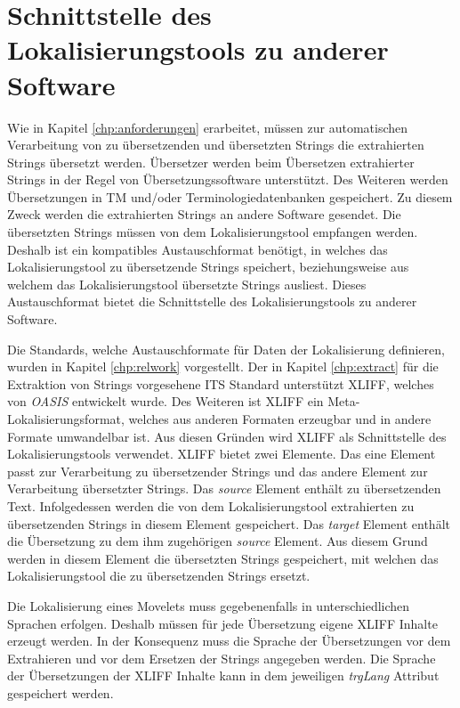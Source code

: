 \chapter{Schnittstelle des Lokalisierungstools zu anderer Software}
Wie in Kapitel \ref{chp:anforderungen} erarbeitet, müssen zur automatischen Verarbeitung von zu übersetzenden und übersetzten Strings die extrahierten Strings übersetzt werden. Übersetzer werden beim Übersetzen extrahierter Strings in der Regel von Übersetzungssoftware unterstützt. Des Weiteren werden Übersetzungen in \ac{TM} und/oder Terminologiedatenbanken gespeichert. 
\autocite[Vgl.][S. 187]{OBrien.2010}
Zu diesem Zweck werden die extrahierten Strings an andere Software gesendet. Die übersetzten Strings müssen von dem Lokalisierungstool empfangen werden. Deshalb ist ein kompatibles Austauschformat benötigt, in welches das Lokalisierungstool zu übersetzende Strings speichert, beziehungsweise aus welchem das Lokalisierungstool übersetzte Strings ausliest. Dieses Austauschformat bietet die Schnittstelle des Lokalisierungstools zu anderer Software.
\par
Die Standards, welche Austauschformate für Daten der Lokalisierung definieren, wurden in Kapitel \ref{chp:relwork} vorgestellt. Der in Kapitel \ref{chp:extract} für die Extraktion von Strings vorgesehene \ac{ITS} Standard unterstützt \ac{XLIFF}, welches von \textit{\ac{OASIS}} entwickelt wurde.
\autocite[Vgl.][]{Filip.2013}
Des Weiteren ist \ac{XLIFF} ein Meta-Lokalisierungsformat, welches aus anderen Formaten erzeugbar und in andere Formate umwandelbar ist.
\autocite[Vgl.][S. 162]{Reineke.2005}
Aus diesen Gründen wird \ac{XLIFF} als Schnittstelle des Lokalisierungstools verwendet.
\ac{XLIFF} bietet zwei Elemente. Das eine Element passt zur Verarbeitung zu übersetzender Strings und das andere Element zur Verarbeitung übersetzter Strings. Das \mbox{\textit{source}} Element enthält zu übersetzenden Text.
\autocite[Vgl.][S. 21]{Schnabel.2014}
Infolgedessen werden die von dem Lokalisierungstool extrahierten zu übersetzenden Strings in diesem Element gespeichert.
Das \mbox{\textit{target}} Element enthält die Übersetzung zu dem ihm zugehörigen \mbox{\textit{source}} Element. 
\autocite[Vgl.][S. 21]{Schnabel.2014}
Aus diesem Grund werden in diesem Element die übersetzten Strings gespeichert, mit welchen das Lokalisierungstool die zu übersetzenden Strings ersetzt.
\par
Die Lokalisierung eines Movelets muss gegebenenfalls in unterschiedlichen Sprachen erfolgen. Deshalb müssen für jede Übersetzung eigene \ac{XLIFF} Inhalte erzeugt werden. In der Konsequenz muss die Sprache der Übersetzungen vor dem Extrahieren und vor dem Ersetzen der Strings angegeben werden. Die Sprache der Übersetzungen der \ac{XLIFF} Inhalte kann in dem jeweiligen \mbox{\textit{trgLang}} Attribut gespeichert werden.
